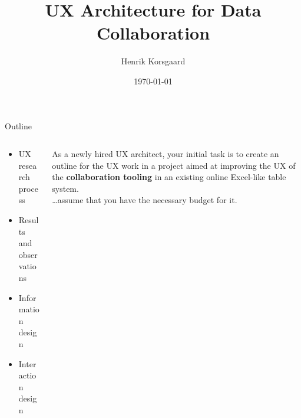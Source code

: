 \documentclass[aspectratio=169]{beamer}
\title[Stibo Systems Case Presentation]{UX Architecture for Data Collaboration}
\date[]{\today}
\author[]{Henrik Korsgaard}
\institute{DEPARTMENT OF COMPUTER SCIENCE} %
\begin{document}
\begin{frame}
\maketitle
\end{frame}

\begin{frame}{Outline}
    \begin{columns}
        \begin{column}{0.5\textwidth}
            \begin{itemize}
                \item UX research process
                \item Results and observations
                \item Information design
                \item Interaction design
            \end{itemize}
        \end{column}
        \begin{column}{0.5\textwidth}
            As a newly hired UX architect, your initial task is to create an outline for the UX work in a project aimed at improving the UX of the \textbf{collaboration tooling}\footnotemark{} in an existing online Excel-like table system.\\
            \vspace{1em}
            {\color{HenrikFontLight}\dots assume that you have the necessary budget for it.}
        \end{column}
    \end{columns}
\end{frame}
\end{document}
